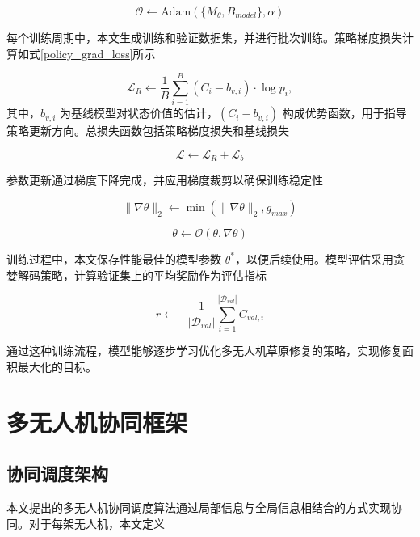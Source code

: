 \documentclass[AutoFakeBold]{LZUThesis}
\begin{document}
\begin{equation}
	\mathcal{O} \leftarrow \text{Adam}(\{M_{\theta}, B_{model}\}, \alpha)
\end{equation}

每个训练周期中，本文生成训练和验证数据集，并进行批次训练。策略梯度损失计算如式\eqref{policy_grad_loss}所示

\begin{equation}\label{policy_grad_loss}
	\mathcal{L}_{R} \leftarrow \frac{1}{B}\sum_{i=1}^{B}(C_i - b_{v,i}) \cdot \log p_i,
\end{equation}
其中，$b_{v,i}$ 为基线模型对状态价值的估计，$(C_i - b_{v,i})$ 构成优势函数，用于指导策略更新方向。总损失函数包括策略梯度损失和基线损失

\begin{equation}
	\mathcal{L} \leftarrow \mathcal{L}_{R} + \mathcal{L}_{b}
\end{equation}

参数更新通过梯度下降完成，并应用梯度裁剪以确保训练稳定性

\begin{equation}
	\|\nabla\theta\|_2 \leftarrow \min(\|\nabla\theta\|_2, g_{max})
\end{equation}

\begin{equation}
	\theta \leftarrow \mathcal{O}(\theta, \nabla\theta)
\end{equation}

训练过程中，本文保存性能最佳的模型参数 $\theta^*$，以便后续使用。模型评估采用贪婪解码策略，计算验证集上的平均奖励作为评估指标

\begin{equation}
	\bar{r} \leftarrow -\frac{1}{|\mathcal{D}_{val}|}\sum_{i=1}^{|\mathcal{D}_{val}|} C_{val,i}
\end{equation}

通过这种训练流程，模型能够逐步学习优化多无人机草原修复的策略，实现修复面积最大化的目标。

\section{多无人机协同框架}

\subsection{协同调度架构}

本文提出的多无人机协同调度算法通过局部信息与全局信息相结合的方式实现协同。对于每架无人机，本文定义
\end{document}
